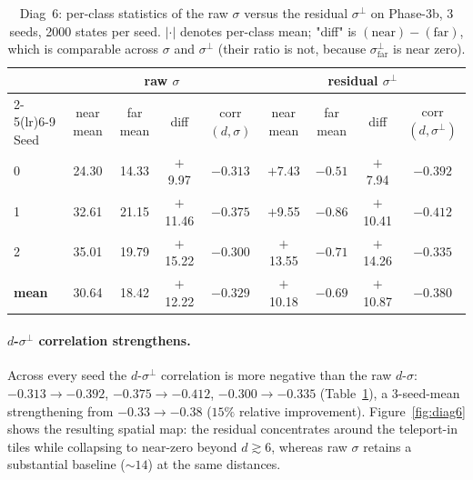 \documentclass[11pt]{article}
\begin{document}
\begin{table}[h]
  \centering
  \caption{Diag~6: per-class statistics of the raw $\sigma$ versus the
           residual $\sigma^\perp$ on Phase-3b, 3 seeds, 2000 states
           per seed.
           $|\cdot|$ denotes per-class mean; "diff" is
           $(\text{near}) - (\text{far})$, which is comparable across
           $\sigma$ and $\sigma^\perp$ (their ratio is not, because
           $\sigma^\perp_\text{far}$ is near zero).}
  \label{tab:diag6}
  \footnotesize
  \begin{tabular}{lcccc|cccc}
    \toprule
    & \multicolumn{4}{c}{raw $\sigma$} & \multicolumn{4}{c}{residual $\sigma^\perp$} \\
    \cmidrule(lr){2-5}\cmidrule(lr){6-9}
    Seed & near mean & far mean & diff & corr$(d,\sigma)$
         & near mean & far mean & diff & corr$(d,\sigma^\perp)$ \\
    \midrule
    0 & 24.30 & 14.33 & $+$9.97  & $-0.313$ & $+$7.43  & $-0.51$ & $+$7.94  & $\mathbf{-0.392}$ \\
    1 & 32.61 & 21.15 & $+$11.46 & $-0.375$ & $+$9.55  & $-0.86$ & $+$10.41 & $\mathbf{-0.412}$ \\
    2 & 35.01 & 19.79 & $+$15.22 & $-0.300$ & $+$13.55 & $-0.71$ & $+$14.26 & $\mathbf{-0.335}$ \\
    \midrule
    \textbf{mean} & 30.64 & 18.42 & $+$12.22 & $-0.329$
                  & $+$10.18 & $-0.69$ & $+$10.87 & $\mathbf{-0.380}$ \\
    \bottomrule
  \end{tabular}
\end{table}

\paragraph{$d$-$\sigma^\perp$ correlation strengthens.}
Across every seed the $d$-$\sigma^\perp$ correlation is more negative than
the raw $d$-$\sigma$: $-0.313 \to -0.392$, $-0.375 \to -0.412$, $-0.300 \to
-0.335$ (Table~\ref{tab:diag6}), a 3-seed-mean strengthening from
$-0.33 \to \mathbf{-0.38}$ ($15\%$ relative improvement).
Figure~\ref{fig:diag6} shows the resulting spatial map: the residual
concentrates around the teleport-in tiles while collapsing to near-zero
beyond $d \gtrsim 6$, whereas raw $\sigma$ retains a substantial baseline
($\sim 14$) at the same distances.
\end{document}
